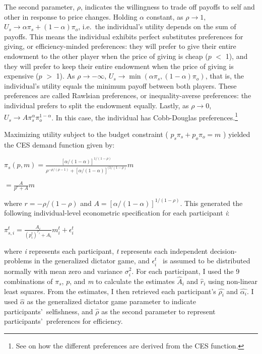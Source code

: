 \documentclass[12pt]{article}
\begin{document}
The second parameter, \(\rho\), indicates the willingness to trade off payoffs to self and other in response to price changes. Holding \(\alpha\) constant, as \(\rho \rightarrow 1\), \(U_{s} \rightarrow \alpha\pi_{s} + (1-\alpha)\pi_{o}\),  i.e.\ the individual\rq s utility depends on the sum of payoffs. This means the individual exhibits perfect substitutes preferences for giving, or efficiency-minded preferences: they will prefer to give their entire endowment to the other player when the price of giving is cheap (\(p\) $<$ 1), and they will prefer to keep their entire endowment when the price of giving is expensive (\(p\) $>$ 1). As \(\rho \rightarrow -\infty\), \(U_{s} \rightarrow \min(\alpha\pi_{s}, (1-\alpha)\pi_{o})\), that is, the individual\rq s utility equals the minimum payoff between both players. These preferences are called Rawlsian preferences, or inequality-averse preferences: the individual prefers to split the endowment equally. Lastly, as \(\rho \rightarrow 0\), \(U_{s} \rightarrow A\pi_{s}^{\alpha}\pi_{o}^{1-\alpha}\). In this case, the individual has Cobb-Douglas preferences.\footnote{See \cite{arrow_1961} on how the different preferences are derived from the CES function.}

Maximizing utility subject to the budget constraint ( \(p_{s}\pi_{s} + p_{o}\pi_{o}=m\) ) yielded the CES demand function given by:
 
\vspace{3mm} \(\pi_{s}(p,m)=\frac{[\alpha/(1-\alpha)]^{1/(1-\rho)}}{\rho^{-\rho/(\rho-1)}+[\alpha/(1-\alpha)]^{(1/(1-\rho)}}m\)

\vspace{4mm} \hspace{14.5mm} \(= \frac{A}{p^{r}+A}m\)
 
\vspace{3mm} \noindent where \(r=-\rho / (1-\rho) \) and \(A=[\alpha / (1-\alpha)]^{1/(1-\rho)} \). This generated the following individual-level econometric specification for each participant \textit{i}: 
 
\vspace{3mm} \( \pi^{t}_{s,i} = \frac{A_{i}}{(p^{t}_{i})^{r_{i}} + A_{i}}m^{t}_{i} + \epsilon^{t}_{i}\)
 
\vspace{3mm} \noindent where \textit{i} represents each participant, \textit{t} represents each independent decision-problems in the generalized dictator game, and \( \epsilon^{t}_{i} \) \ is assumed to be distributed normally with mean zero and variance \(\sigma^{2}_{i}\). For each participant, I used the 9 combinations of \(\pi_{s}\), \(p\), and \textit{m} to calculate the estimates  \( \hat{A}_{i} \) and \( \hat{r}_{i} \) using non-linear least squares. From the estimates, I then retrieved each participant\rq s \( \hat{\rho_{i}}\) and \( \hat{\alpha_{i}} \). I used \(\hat{\alpha}\) as the generalized dictator game parameter to indicate participants\rq \ selfishness, and \(\hat{\rho}\) as the second parameter to represent participants\rq \ preferences for efficiency.
\end{document}
